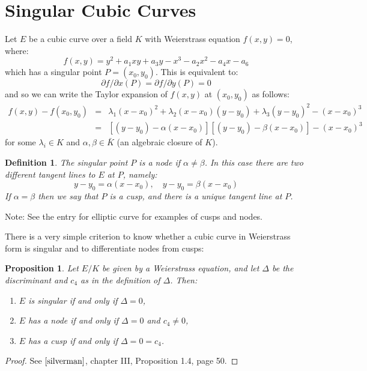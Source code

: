 \documentclass[12pt]{article}
\newtheorem{defn}{Definition}
\newtheorem{prop}{Proposition}
\begin{document}
\section{Singular Cubic Curves}

Let $E$ be a cubic curve over a field $K$ with Weierstrass
equation $f(x,y)=0$, where:
$$f(x,y)=y^2+a_1xy+a_3y-x^3-a_2x^2-a_4x-a_6$$
which has a singular point $P=(x_0,y_0)$. This is equivalent to:
$$\partial f/ \partial x(P)=\partial f/ \partial y(P)=0$$
and so we can write the Taylor expansion of $f(x,y)$ at
$(x_0,y_0)$ as follows:
\begin{eqnarray}
\nonumber f(x,y)-f(x_0,y_0)&=&\lambda_1(x-x_0)^2+\lambda_2(x-x_0)(y-y_0)+\lambda_3(y-y_0)^2-(x-x_0)^3\\
\nonumber
&=&[(y-y_0)-\alpha(x-x_0)][(y-y_0)-\beta(x-x_0)]-(x-x_0)^3
\end{eqnarray}
for some $\lambda_i \in K$ and $\alpha,\beta \in \bar{K}$ (an
algebraic closure of $K$).\\

\begin{defn}
The singular point $P$ is a \emph{node} if $\alpha\neq\beta$. In this
case there are two different tangent lines to $E$ at $P$, namely:
$$y-y_0=\alpha(x-x_0),\quad y-y_0=\beta(x-x_0)$$
If $\alpha=\beta$ then we say that $P$ is a \emph{cusp}, and there is a
unique tangent line at $P$.
\end{defn}

Note: See the entry for elliptic curve for examples of cusps and
nodes.

There is a very simple criterion to know whether a cubic curve in
Weierstrass form is singular and to differentiate nodes from
cusps:
\begin{prop}
Let $E/K$ be given by a Weierstrass equation, and let $\Delta$ be
the discriminant and $c_4$ as in the definition of $\Delta$. Then:
\begin{enumerate}
\item $E$ is singular if and only if $\Delta=0$,\\

\item $E$ has a node if and only if $\Delta=0$ and $c_4\neq 0$,\\

\item $E$ has a cusp if and only if $\Delta=0=c_4$.
\end{enumerate}
\end{prop}
\begin{proof}
See $\cite{silverman}$, chapter III, Proposition 1.4, page 50.
\end{proof}
\end{document}
